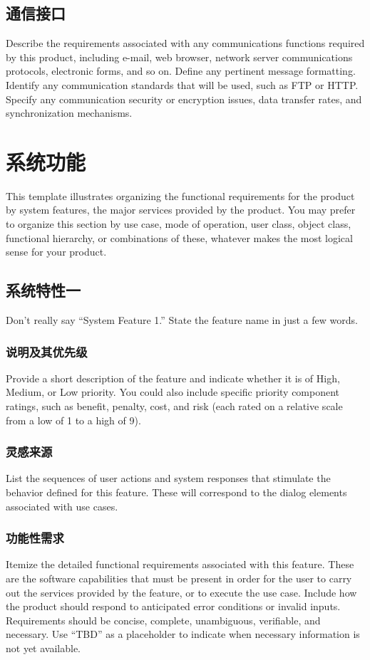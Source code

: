 \documentclass{ctexart}
\begin{document}
\subsection{通信接口}
Describe the requirements associated with any communications functions 
required by this product, including e-mail, web browser, network server 
communications protocols, electronic forms, and so on. Define any pertinent 
message formatting. Identify any communication standards that will be used, such 
as FTP or HTTP. Specify any communication security or encryption issues, data 
transfer rates, and synchronization mechanisms.



\section{系统功能}\label{S:system-features}
This template illustrates organizing the functional requirements for the 
product by system features, the major services provided by the product. You may 
prefer to organize this section by use case, mode of operation, user class, 
object class, functional hierarchy, or combinations of these, whatever makes the 
most logical sense for your product.
\subsection{系统特性一}
Don't really say ``System Feature 1.'' State the feature name in just a few 
words.
\subsubsection{说明及其优先级}
Provide a short description of the feature and indicate whether it is of 
High, Medium, or Low priority. You could also include specific priority 
component ratings, such as benefit, penalty, cost, and risk (each rated on a 
relative scale from a low of 1 to a high of 9).

\subsubsection{灵感来源}
List the sequences of user actions and system responses that stimulate the 
behavior defined for this feature. These will correspond to the dialog elements 
associated with use cases.

\subsubsection{功能性需求}
Itemize the detailed functional requirements associated with this feature.  
These are the software capabilities that must be present in order for the user 
to carry out the services provided by the feature, or to execute the use case.  
Include how the product should respond to anticipated error conditions or 
invalid inputs. Requirements should be concise, complete, unambiguous, 
verifiable, and necessary. Use ``TBD'' as a placeholder to indicate when necessary 
information is not yet available.
\end{document}
